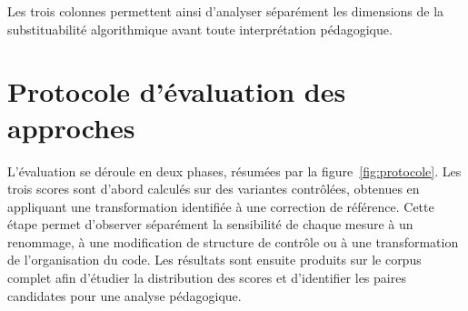 {Les trois colonnes permettent ainsi d'analyser séparément les dimensions de
la substituabilité algorithmique avant toute interprétation pédagogique.

\section{Protocole d'évaluation des approches}

L'évaluation se déroule en deux phases, résumées par la
figure~\ref{fig:protocole}. Les trois scores sont d'abord calculés sur des
variantes contrôlées, obtenues en appliquant une transformation identifiée à
une correction de référence. Cette étape permet d'observer séparément la
sensibilité de chaque mesure à un renommage, à une modification de structure
de contrôle ou à une transformation de l'organisation du code. Les résultats
sont ensuite produits sur le corpus complet afin d'étudier la distribution
des scores et d'identifier les paires candidates pour une analyse
pédagogique.

\begin{figure}[H]
\centering
{}
\end{figure}}
